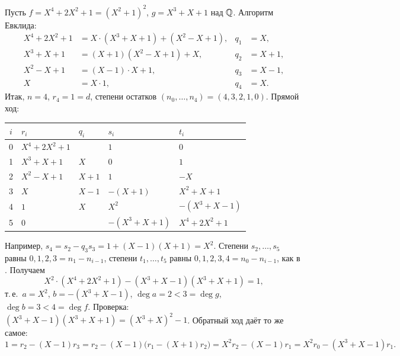 \begin{example}[1.8d]
Пусть $f=X^4+2X^2+1=(X^2+1)^2$, $g=X^3+X+1$ над $\mathbb Q$. Алгоритм Евклида:
\[
\begin{aligned}
X^4+2X^2+1&=X\cdot(X^3+X+1)+(X^2-X+1), & q_1&=X,\\
X^3+X+1&=(X+1)(X^2-X+1)+X, & q_2&=X+1,\\
X^2-X+1&=(X-1)\cdot X+1, & q_3&=X-1,\\
X&=X\cdot1, & q_4&=X.
\end{aligned}
\]
Итак, $n=4$, $r_4=1=d$, степени остатков $(n_0,\dots,n_4)=(4,3,2,1,0)$. Прямой ход:
\begin{center}
\begin{tabular}{@{}cllll@{}}
\toprule
$i$ & $r_i$ & $q_i$ & $s_i$ & $t_i$\\
\midrule
0 & $X^4+2X^2+1$ & & $1$ & $0$\\
1 & $X^3+X+1$ & $X$ & $0$ & $1$\\
2 & $X^2-X+1$ & $X+1$ & $1$ & $-X$\\
3 & $X$ & $X-1$ & $-(X+1)$ & $X^2+X+1$\\
4 & $1$ & $X$ & $X^2$ & $-(X^3+X-1)$\\
5 & $0$ & & $-(X^3+X+1)$ & $X^4+2X^2+1$\\
\bottomrule
\end{tabular}
\end{center}
Например, $s_4=s_2-q_3s_3=1+(X-1)(X+1)=X^2$. Степени $s_2,\dots,s_5$ равны $0,1,2,3=n_1-n_{i-1}$, степени
$t_1,\dots,t_5$ равны $0,1,2,3,4=n_0-n_{i-1}$, как в . Получаем
\[
X^2\cdot(X^4+2X^2+1)-(X^3+X-1)(X^3+X+1)=1,
\]
т.\,е.\ $a=X^2$, $b=-(X^3+X-1)$, $\deg a=2<3=\deg g$, $\deg b=3<4=\deg f$. Проверка: $(X^3+X-1)(X^3+X+1)=(X^3+X)^2-1$. Обратный ход даёт то же самое:
\[
1=r_2-(X-1)r_3=r_2-(X-1)\bigl(r_1-(X+1)r_2\bigr)=X^2r_2-(X-1)r_1=X^2r_0-(X^3+X-1)r_1 .
\]
\end{example}


